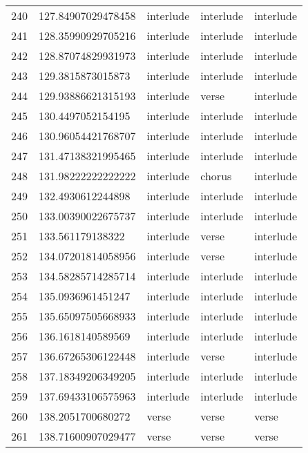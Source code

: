 \begin{table}[]
\begin{tabular}{lllll}
    240  & 127.84907029478458 & interlude    & interlude       & interlude      \\
    241  & 128.35990929705216 & interlude    & interlude       & interlude      \\
    242  & 128.87074829931973 & interlude    & interlude       & interlude      \\
    243  & 129.3815873015873  & interlude    & interlude       & interlude      \\
    244  & 129.93886621315193 & interlude    & verse           & interlude      \\
    245  & 130.4497052154195  & interlude    & interlude       & interlude      \\
    246  & 130.96054421768707 & interlude    & interlude       & interlude      \\
    247  & 131.47138321995465 & interlude    & interlude       & interlude      \\
    248  & 131.98222222222222 & interlude    & chorus          & interlude      \\
    249  & 132.4930612244898  & interlude    & interlude       & interlude      \\
    250  & 133.00390022675737 & interlude    & interlude       & interlude      \\
    251  & 133.561179138322   & interlude    & verse           & interlude      \\
    252  & 134.07201814058956 & interlude    & verse           & interlude      \\
    253  & 134.58285714285714 & interlude    & interlude       & interlude      \\
    254  & 135.0936961451247  & interlude    & interlude       & interlude      \\
    255  & 135.65097505668933 & interlude    & interlude       & interlude      \\
    256  & 136.1618140589569  & interlude    & interlude       & interlude      \\
    257  & 136.67265306122448 & interlude    & verse           & interlude      \\
    258  & 137.18349206349205 & interlude    & interlude       & interlude      \\
    259  & 137.69433106575963 & interlude    & interlude       & interlude      \\
    260  & 138.2051700680272  & verse        & verse           & verse          \\
    261  & 138.71600907029477 & verse        & verse           & verse          \\

\end{tabular}
\end{table}
